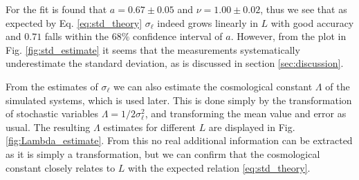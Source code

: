 For the fit is found that $a = 0.67 \pm 0.05$ and $\nu = 1.00 \pm 0.02$, thus we see that as expected by Eq. \eqref{eq:std_theory} $\sigma_\ell$ indeed grows linearly in $L$ with good accuracy and $0.71$ falls within the $68\%$ confidence interval of $a$.
However, from the plot in Fig. \ref{fig:std_estimate} it seems that the measurements systematically underestimate the standard deviation, as is discussed in section \ref{sec:discussion}.

From the estimates of $\sigma_\ell$ we can also estimate the cosmological constant $\Lambda$ of the simulated systems, which is used later. This is done simply by the transformation of stochastic variables $\Lambda = 1/2\sigma_\ell^2$, and transforming the mean value and error as usual.
The resulting $\Lambda$ estimates for different $L$ are displayed in Fig. \ref{fig:Lambda_estimate}. From this no real additional information can be extracted as it is simply a transformation, but we can confirm that the cosmological constant closely relates to $L$ with the expected relation \eqref{eq:std_theory}.



